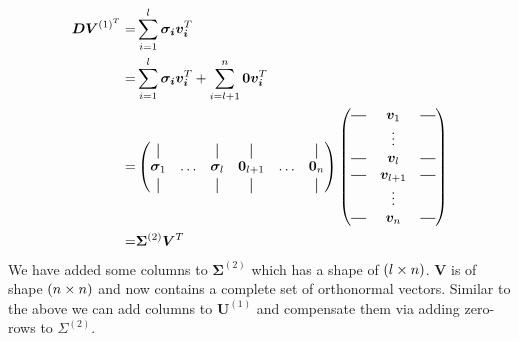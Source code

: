 \begin{align}
    \bm{DV}^{(1)^T} =& \sum_{i=1}^l \bm{\sigma_i} \bm{v_i}^T                                      \\
                    =& \sum_{i=1}^l \bm{\sigma_i} \bm{v_i}^T + \sum_{i=l+1}^n \bm{0} \bm{v_i}^T   \\
                    =& \begin{pmatrix}
                            \vertbar      &        & \vertbar      & \vertbar          &        & \vertbar      \\
                            \bm{\sigma}_1 & \hdots & \bm{\sigma}_l & \bm{0}_{l+1} & \hdots & \bm{0}_n \\
                            \vertbar      &        & \vertbar      & \vertbar          &        & \vertbar 
                        \end{pmatrix}
                        \begin{pmatrix}
                            \horzbar & \bm{v}_1 & \horzbar \\
                                    & \vdots   &           \\
                            \horzbar & \bm{v}_l & \horzbar \\
                            \horzbar & \bm{v}_{l+1} & \horzbar \\
                                        & \vdots   &          \\
                            \horzbar & \bm{v}_n & \horzbar 
                        \end{pmatrix} \\
                    =& \bm{\Sigma}^{(2)} \bm{V}^T
\end{align}
We have added some columns to $\bm{\Sigma}^{(2)}$ which has a shape of $(l \times n)$. 
$\bm{V}$ is of shape $(n \times n)$ and now contains a complete set of orthonormal vectors.
Similar to the above we can add columns to $\bm{U}^{(1)}$ and compensate them via adding
zero-rows to $\Sigma^{(2)}$.
